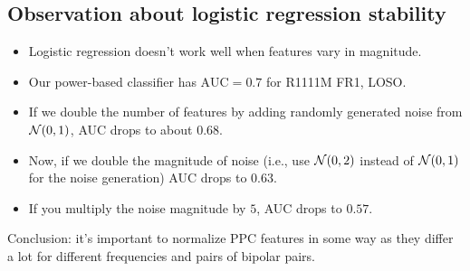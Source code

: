 \documentclass[a4paper]{article}
\begin{document}
\subsection*{Observation about logistic regression stability}

\begin{itemize}
\item Logistic regression doesn't work well when features vary in magnitude.
\item Our power-based classifier has $\textrm{AUC}=0.7$ for R1111M FR1, LOSO.
\item If we double the number of features by adding randomly generated noise from ${\cal N}(0,1)$, AUC drops to
about $0.68$.
\item Now, if we double the magnitude of noise (i.e., use ${\cal N}(0,2)$ instead of ${\cal N}(0,1)$ for the noise generation)
AUC drops to $0.63$.
\item If you multiply the noise magnitude by $5$, AUC drops to $0.57$.
\end{itemize}

Conclusion: it's important to normalize PPC features in some way as they differ a lot for different frequencies and
pairs of bipolar pairs.
\end{document}
